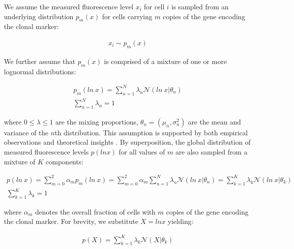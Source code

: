 \documentclass[10pt,letterpaper]{article}
\begin{document}
We assume the measured fluorescence level $x_i$ for cell $i$ is sampled from an underlying distribution $p_m(x)$ for cells carrying $m$ copies of the gene encoding the clonal marker:
\begin{linenomath} \begin{gather}
x_i \sim p_m(x)
\end{gather} \end{linenomath}
We further assume that $p_m(x)$ is comprised of a mixture of one or more lognormal distributions:
\begin{linenomath} \begin{gather}
p_m(ln\ x) = \sum^{N}_{n=1}\lambda_n \mathcal{N}(ln\ x|\theta_{n}) \\
\sum^{N}_{n=1}\lambda_n = 1
\end{gather} \end{linenomath}
where $0 \leq \lambda \leq 1$ are the mixing proportions, $\theta_n=(\mu_n,\sigma_n^2)$ are the mean and variance of the $n$th distribution. This assumption is supported by both empirical observations and theoretical insights \cite{Furusawa2005,Beal2017}. By superposition, the global distribution of measured fluorescence levels $p(ln x)$ for all values of $m$ are also sampled from a mixture of $K$ components:
\begin{linenomath} \begin{gather}
p(ln\ x) =  \sum^{2}_{m=0} \alpha_m p_m(ln\ x) = \sum^{2}_{m=0} \alpha_m
\sum^{N}_{n=1}\lambda_n \mathcal{N}(ln\ x|\theta_{n}) = \sum^{K}_{k=1}\lambda_k \mathcal{N}(ln\ x|\theta_{k}) \\
\sum^{K}_{k=1}\lambda_k=1
\end{gather} \end{linenomath}
where $\alpha_m$ denotes the overall fraction of cells with $m$ copies of the gene encoding the clonal marker. For brevity, we substitute $X = ln x$ yielding:
\begin{linenomath} \begin{gather}
p(X) = \sum^{K}_{k=1}\lambda_k \mathcal{N}(X|\theta_{k})
\end{gather} \end{linenomath}
\end{document}
